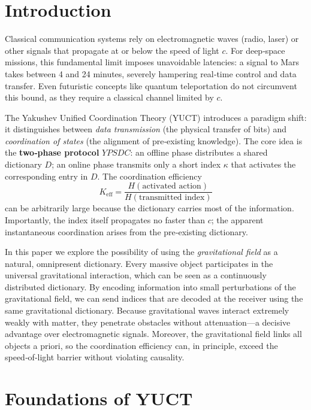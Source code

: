 \documentclass[12pt,a4paper]{article}
\newcommand{\Keff}{K_{\mathrm{eff}}}
\newcommand{\YPSDC}{YPSDC}
\begin{document}
	\tableofcontents
	\newpage
	
	\section{Introduction}
	\label{sec:intro}
	
	Classical communication systems rely on electromagnetic waves (radio, laser) or other signals that propagate at or below the speed of light \(c\). For deep‑space missions, this fundamental limit imposes unavoidable latencies: a signal to Mars takes between 4 and 24 minutes, severely hampering real‑time control and data transfer. Even futuristic concepts like quantum teleportation do not circumvent this bound, as they require a classical channel limited by \(c\).
	
	The Yakushev Unified Coordination Theory (YUCT) \cite{Yakushev2026} introduces a paradigm shift: it distinguishes between \emph{data transmission} (the physical transfer of bits) and \emph{coordination of states} (the alignment of pre‑existing knowledge). The core idea is the \textbf{two‑phase protocol} \(\YPSDC\): an offline phase distributes a shared dictionary \(D\); an online phase transmits only a short index \(\kappa\) that activates the corresponding entry in \(D\). The coordination efficiency
	\begin{equation}
		\Keff = \frac{H(\text{activated action})}{H(\text{transmitted index})}
	\end{equation}
	can be arbitrarily large because the dictionary carries most of the information. Importantly, the index itself propagates no faster than \(c\); the apparent instantaneous coordination arises from the pre‑existing dictionary.
	
	In this paper we explore the possibility of using the \emph{gravitational field} as a natural, omnipresent dictionary. Every massive object participates in the universal gravitational interaction, which can be seen as a continuously distributed dictionary. By encoding information into small perturbations of the gravitational field, we can send indices that are decoded at the receiver using the same gravitational dictionary. Because gravitational waves interact extremely weakly with matter, they penetrate obstacles without attenuation—a decisive advantage over electromagnetic signals. Moreover, the gravitational field links all objects a priori, so the coordination efficiency can, in principle, exceed the speed‑of‑light barrier without violating causality.
	
	\section{Foundations of YUCT}
	\label{sec:foundations}
	
\end{document}

